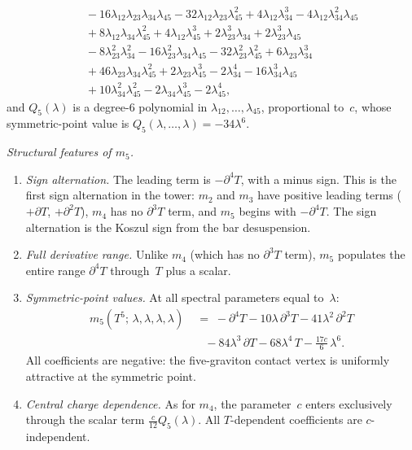 \documentclass[11pt]{article}
\begin{document}
\begin{theorem}
\begin{align*}
\\
&\quad
- 16\lambda_{12}\lambda_{23}\lambda_{34}\lambda_{45}
- 32\lambda_{12}\lambda_{23}\lambda_{45}^2
+ 4\lambda_{12}\lambda_{34}^3
- 4\lambda_{12}\lambda_{34}^2\lambda_{45}
\\
&\quad
+ 8\lambda_{12}\lambda_{34}\lambda_{45}^2
+ 4\lambda_{12}\lambda_{45}^3
+ 2\lambda_{23}^3\lambda_{34}
+ 2\lambda_{23}^3\lambda_{45}
\\
&\quad
- 8\lambda_{23}^2\lambda_{34}^2
- 16\lambda_{23}^2\lambda_{34}\lambda_{45}
- 32\lambda_{23}^2\lambda_{45}^2
+ 6\lambda_{23}\lambda_{34}^3
\\
&\quad
+ 46\lambda_{23}\lambda_{34}\lambda_{45}^2
+ 2\lambda_{23}\lambda_{45}^3
- 2\lambda_{34}^4
- 16\lambda_{34}^3\lambda_{45}
\\
&\quad
+ 10\lambda_{34}^2\lambda_{45}^2
- 2\lambda_{34}\lambda_{45}^3
- 2\lambda_{45}^4,
\end{align*}
and $Q_5(\lambda)$ is a degree-$6$ polynomial in
$\lambda_{12}, \ldots, \lambda_{45}$, proportional to~$c$,
whose symmetric-point value is $Q_5(\lambda, \ldots, \lambda)
= -34\lambda^6$.
\end{theorem}

\noindent\textit{Structural features of $m_5$.}
\begin{enumerate}[label=\textup{(\roman*)},nosep]
\item \textit{Sign alternation.}  The leading term is
  $-\partial^4 T$, with a minus sign.  This is the first sign
  alternation in the tower: $m_2$ and $m_3$ have positive leading
  terms ($+\partial T$, $+\partial^2 T$), $m_4$ has no
  $\partial^3 T$ term, and $m_5$ begins with $-\partial^4 T$.
  The sign alternation is the Koszul sign from the bar
  desuspension.

\item \textit{Full derivative range.}  Unlike $m_4$ (which has
  no $\partial^3 T$ term), $m_5$ populates the entire range
  $\partial^4 T$ through~$T$ plus a scalar.

\item \textit{Symmetric-point values.}  At all spectral
  parameters equal to~$\lambda$:
  \begin{equation}\label{eq:m5-symmetric-wn}
  \begin{aligned}
  m_5(T^5;\,\lambda,\lambda,\lambda,\lambda)
  &\;=\;
  -\partial^4 T
  - 10\lambda\,\partial^3 T
  - 41\lambda^2\,\partial^2 T
  \\
  &\quad
  - 84\lambda^3\,\partial T
  - 68\lambda^4\, T
  - \frac{17c}{6}\,\lambda^6.
  \end{aligned}
  \end{equation}
  All coefficients are negative: the five-graviton contact
  vertex is uniformly attractive at the symmetric point.

\item \textit{Central charge dependence.}  As for $m_4$,
  the parameter~$c$ enters exclusively through the scalar
  term $\frac{c}{12}Q_5(\lambda)$.  All $T$-dependent
  coefficients are $c$-independent.
\end{enumerate}
\end{document}

